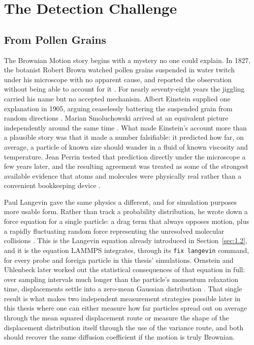 \chapter{The Detection Challenge}
\label{chap:2}

\section{From Pollen Grains}
\label{sec:2.1}
\hspace{\parindent} The Brownian Motion story begins with a mystery no one could explain. In 1827, the botanist Robert Brown watched pollen grains suspended in water twitch under his microscope with no apparent cause, and reported the observation without being able to account for it \cite{Brown1828}. For nearly seventy-eight years the jiggling carried his name but no accepted mechanism. Albert Einstein supplied one explanation in 1905, arguing ceaselessly battering the suspended grain from random directions \cite{Einstein1905, Einstein1956}. Marian Smoluchowski arrived at an equivalent picture independently around the same time \cite{Smoluchowski1906}. What made Einstein's account more than a plausible story was that it made a number falsifiable: it predicted how far, on average, a particle of known size should wander in a fluid of known viscosity and temperature. Jean Perrin tested that prediction directly under the microscope a few years later, and the resulting agreement was treated as some of the strongest available evidence that atoms and molecules were physically real rather than a convenient bookkeeping device \cite{Perrin1916}.

\hspace{\parindent} Paul Langevin gave the same physics a different, and for simulation purposes more usable form. Rather than track a probability distribution, he wrote down a force equation for a single particle: a drag term that always opposes motion, plus a rapidly fluctuating random force representing the unresolved molecular collisions \cite{Coffey2004}. This is the Langevin equation already introduced in Section~\ref{sec:1.2}, and it is the equation LAMMPS integrates, through its \texttt{fix langevin} command, for every probe and foreign particle in this thesis' simulations. Ornstein and Uhlenbeck later worked out the statistical consequences of that equation in full: over sampling intervals much longer than the particle's momentum relaxation time, displacements settle into a zero-mean Gaussian distribution \cite{Uhlenbeck1930}. That single result is what makes two independent measurement strategies possible later in this thesis where one can either measure how far particles spread out on average through the mean squared displacement route or measure the shape of the displacement distribution itself through the use of the variance route, and both should recover the same diffusion coefficient if the motion is truly Brownian.

